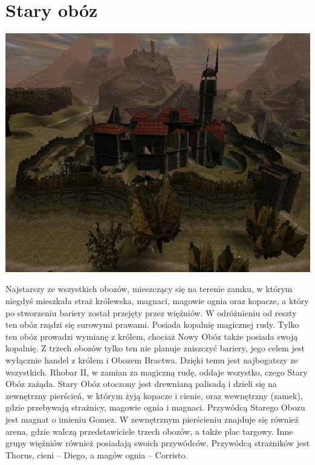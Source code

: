 \documentclass[11pt,polish, openany]{book}
\begin{document}
\section{Stary obóz}
\begin{center}
 \includegraphics[scale=0.6]{staryoboz.jpg}
\end{center}
Najstarszy ze wszystkich obozów, mieszczący się na terenie zamku, w którym niegdyś mieszkała straż królewska, magnaci, magowie ognia oraz kopacze, a który po stworzeniu bariery został przejęty przez więźniów. W odróżnieniu od reszty ten obóz rządzi się surowymi prawami. Posiada kopalnię magicznej rudy. Tylko ten obóz prowadzi wymianę z królem, chociaż Nowy Obóz także posiada swoją kopalnię. Z trzech obozów tylko ten nie planuje zniszczyć bariery, jego celem jest wyłącznie handel z królem i Obozem Bractwa. Dzięki temu jest najbogatszy ze wszystkich. Rhobar II, w zamian za magiczną rudę, oddaje wszystko, czego Stary Obóz zażąda. Stary Obóz otoczony jest drewnianą palisadą i dzieli się na zewnętrzny pierścień, w którym żyją kopacze i cienie, oraz wewnętrzny (zamek), gdzie przebywają strażnicy, magowie ognia i magnaci. Przywódcą Starego Obozu jest magnat o imieniu Gomez. W zewnętrznym pierścieniu znajduje się również arena, gdzie walczą przedstawiciele trzech obozów, a także plac targowy. Inne grupy więźniów również posiadają swoich przywódców. Przywódcą strażników jest Thorus, cieni – Diego, a magów ognia – Corristo.
\end{document}
